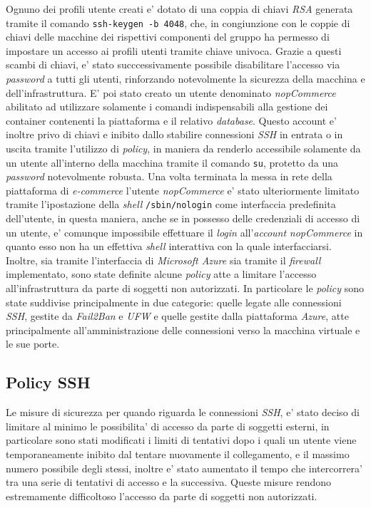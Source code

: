 \documentclass[a4paper]{report}
\begin{document}
		Ognuno dei profili utente creati e' dotato di una coppia di chiavi \emph{RSA} generata tramite il comando
		\texttt{ssh-keygen -b 4048}, che, in congiunzione con le coppie di chiavi delle macchine dei rispettivi
		componenti del gruppo ha permesso di impostare un accesso ai profili utenti tramite chiave univoca. 
		Grazie a questi scambi di chiavi, e' stato succcessivamente possibile disabilitare l'accesso via \emph{password}
		a tutti gli utenti, rinforzando notevolmente la sicurezza della macchina e dell'infrastruttura. E' poi stato
		creato un utente denominato \emph{nopCommerce} abilitato ad utilizzare solamente i comandi indispensabili alla
		gestione dei container contenenti la piattaforma e il relativo \emph{database}. Questo account e' inoltre privo
		di chiavi e inibito dallo stabilire connessioni \emph{SSH} in entrata o in uscita tramite l'utilizzo di
		\emph{policy}, in maniera da renderlo accessibile solamente da un utente all'interno della macchina tramite il
		comando \texttt{su}, protetto da una \emph{password} notevolmente robusta. Una volta terminata la messa in rete
		della piattaforma di \emph{e-commerce} l'utente \emph{nopCommerce} e' stato ulteriormente limitato tramite
		l'ipostazione della \emph{shell} \texttt{/sbin/nologin} come interfaccia predefinita dell'utente, in questa
		maniera, anche se in possesso delle credenziali di accesso di un utente, e' comunque impossibile effettuare il
		\emph{login} all'\emph{account} \emph{nopCommerce} in quanto esso non ha un effettiva \emph{shell} interattiva
		con la quale interfacciarsi.
		Inoltre, sia tramite l'interfaccia di \emph{Microsoft Azure} sia tramite il \emph{firewall} implementato, sono
		state definite alcune \emph{policy} atte a limitare l'accesso all'infrastruttura da parte di soggetti non
		autorizzati. In particolare le \emph{policy} sono state suddivise principalmente in due categorie: quelle legate
		alle connessioni \emph{SSH}, gestite da \emph{Fail2Ban} e \emph{UFW} e quelle gestite dalla piattaforma
		\emph{Azure}, atte principalmente all'amministrazione delle connessioni verso la macchina virtuale e le sue
		porte.

		\subsection{Policy SSH}\label{policy_ssh}
			Le misure di sicurezza per quando riguarda le connessioni \emph{SSH}, e' stato deciso di limitare al minimo
			le possibilita' di accesso da parte di soggetti esterni, in particolare sono stati modificati i limiti di
			tentativi dopo i quali un utente viene temporaneamente inibito dal tentare nuovamente il collegamento, e il
			massimo numero possibile degli stessi, inoltre e' stato aumentato il tempo che intercorrera' tra una serie
			di tentativi di accesso e la successiva.  Queste misure rendono estremamente difficoltoso l'accesso da parte
			di soggetti non autorizzati.
			
\end{document}
